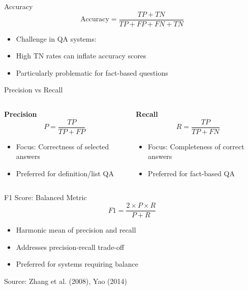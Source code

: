 \begin{frame}{Accuracy}
\[
\text{Accuracy} = \frac{TP + TN}{TP + FP + FN + TN}
\]

\begin{itemize}
    \item Challenge in QA systems:
    \item High TN rates can inflate accuracy scores
    \item Particularly problematic for fact-based questions
\end{itemize}
\end{frame}

\begin{frame}{Precision vs Recall}
\begin{columns}
\begin{column}{0.5\textwidth}
\textbf{Precision}
\[
P = \frac{TP}{TP + FP}
\]
\begin{itemize}
    \item Focus: Correctness of selected answers
    \item Preferred for definition/list QA
\end{itemize}
\end{column}

\begin{column}{0.5\textwidth}
\textbf{Recall}
\[
R = \frac{TP}{TP + FN}
\]
\begin{itemize}
    \item Focus: Completeness of correct answers
    \item Preferred for fact-based QA
\end{itemize}
\end{column}
\end{columns}
\end{frame}

\begin{frame}{F1 Score: Balanced Metric}
\[
F1 = \frac{2 \times P \times R}{P + R}
\]

\begin{itemize}
    \item Harmonic mean of precision and recall
    \item Addresses precision-recall trade-off
    \item Preferred for systems requiring balance
\end{itemize}

\footnotesize{Source: Zhang et al. (2008), Yao (2014)}
\end{frame}

